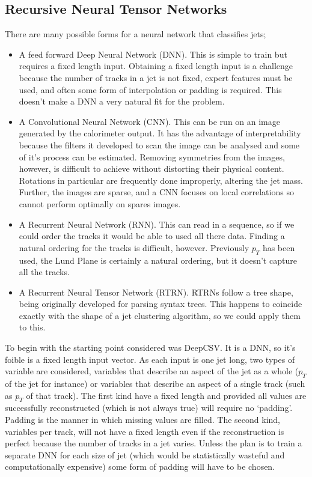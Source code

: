 \subsection{Recursive Neural Tensor Networks}
There are many possible forms for a neural network that classifies jets;
\begin{itemize}
    \item A feed forward Deep Neural Network (DNN). This is simple to train but requires a fixed length input.
        Obtaining a fixed length input is a challenge because the number of tracks in a jet is not fixed,
        expert features must be used, and often some form of interpolation or padding is required. 
        This doesn't make a DNN a very natural fit for the problem.
    \item A Convolutional Neural Network (CNN). This can be run on an image generated by the calorimeter output.
        It has the advantage of interpretability because the filters it developed to scan the image can be analysed and some of it's process can be estimated.
        Removing symmetries from the images, however, is difficult to achieve without distorting their physical content.
        Rotations in particular are frequently done improperly, altering the jet mass.
        Further, the images are sparse, and a CNN focuses on local correlations so cannot perform optimally on spares images.
    \item A Recurrent Neural Network (RNN). This can read in a sequence, so if we could order the tracks it would be able to used all there data.
        Finding a natural ordering for the tracks is difficult, however.
        Previously \(p_T\) has been used, the Lund Plane is certainly a natural ordering,
        but it doesn't capture all the tracks.
    \item A Recurrent Neural Tensor Network (RTRN). RTRNs follow a tree shape, being originally developed for parsing syntax trees.
        This happens to coincide exactly with the shape of a jet clustering algorithm, so we could apply them to this.
\end{itemize}
To begin with the starting point considered was DeepCSV. It is a DNN, so it's foible is a fixed length input vector.
As each input is one jet long, two types of variable are considered, variables that describe an aspect of the jet as a whole
(\(p_T\) of the jet for instance) or variables that describe an aspect of a single track (such as \(p_T\) of that track).
The first kind have a fixed length and provided all values are successfully reconstructed (which is not always true)
will require no `padding'.
Padding is the manner in which missing values are filled.
The second kind, variables per track, will not have a fixed length even if the reconstruction is perfect because the number of tracks in a jet varies.
Unless the plan is to train a separate DNN for each size of jet (which would be statistically wasteful and computationally expensive)
some form of padding will have to be chosen.

